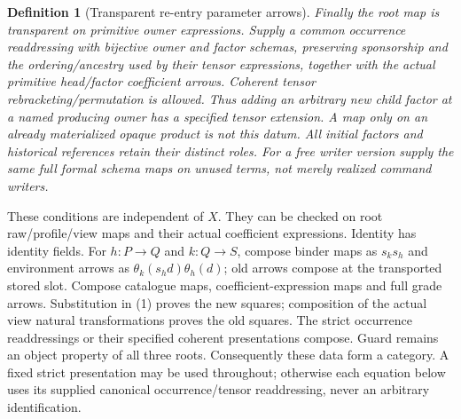 \documentclass[11pt]{article}
\newtheorem{definition}{Definition}\newtheorem{theorem}{Theorem}\newtheorem{proposition}{Proposition}
\begin{document}
\begin{definition}[Transparent re-entry parameter arrows]
Finally the root map is transparent on primitive owner expressions. Supply a common occurrence readdressing with bijective owner and factor schemas, preserving sponsorship and the ordering/ancestry used by their tensor expressions, together with the actual primitive head/factor coefficient arrows. Coherent tensor rebracketing/permutation is allowed. Thus adding an arbitrary new child factor at a named producing owner has a specified tensor extension. A map only on an already materialized opaque product is not this datum. All initial factors and historical references retain their distinct roles. For a free writer version supply the same full formal schema maps on unused terms, not merely realized command writers.
\end{definition}

These conditions are independent of $X$. They can be checked on root raw/profile/view maps and their actual coefficient expressions. Identity has identity fields. For $h:P\to Q$ and $k:Q\to S$, compose binder maps as $s_k s_h$ and environment arrows as $\theta_k(s_h d)\theta_h(d)$; old arrows compose at the transported stored slot. Compose catalogue maps, coefficient-expression maps and full grade arrows. Substitution in (1) proves the new squares; composition of the actual view natural transformations proves the old squares. The strict occurrence readdressings or their specified coherent presentations compose. Guard remains an object property of all three roots. Consequently these data form a category. A fixed strict presentation may be used throughout; otherwise each equation below uses its supplied canonical occurrence/tensor readdressing, never an arbitrary identification.
\end{document}
